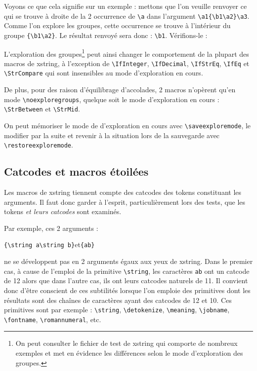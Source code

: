 \documentclass[a4paper,10pt]{article}
\newcommand\Xstring{\textsf{xstring}\xspace}
\newcommand\verbinline{\lstinline[basicstyle=\normalsize\ttfamily]}
\begin{document}
Voyons ce que cela signifie sur un exemple : mettons que l'on veuille renvoyer ce qui se trouve à droite de la 2\ieme{} occurrence de \verb|\a| dans l'argument \verb|\a1{\b1\a2}\a3|. Comme l'on explore les groupes, cette occurrence se trouve à l'intérieur du groupe \verb|{\b1\a2}|. Le résultat renvoyé sera donc : \verb|\b1|. Vérifions-le :



L'exploration des groupes\footnote{On peut consulter le fichier de test de \Xstring qui comporte de nombreux exemples et met en évidence les différences selon le mode d'exploration des groupes.} peut ainsi changer le comportement de la plupart des macros de \Xstring, à l'exception de \verbinline|\IfInteger|, \verbinline|\IfDecimal|, \verbinline|\IfStrEq|, \verbinline|\IfEq| et \verbinline|\StrCompare| qui sont insensibles au mode d'exploration en cours.

De plus, pour des raison d'équilibrage d'accolades, 2 macros n'opèrent qu'en mode \verbinline|\noexploregroups|, quelque soit le mode d'exploration en cours : \verbinline|\StrBetween| et \verbinline|\StrMid|.\medskip

On peut mémoriser le mode de d'exploration en cours avec \verbinline|\saveexploremode|, le modifier par la suite et revenir à la situation lors de la sauvegarde avec \verbinline|\restoreexploremode|.

\subsection{Catcodes et macros étoilées}
\label{macrosetoilees}
Les macros de \Xstring tiennent compte des catcodes des tokens constituant les arguments. Il faut donc garder à l'esprit, particulièrement lors des tests, que les tokens \emph{et leurs catcodes} sont examinés.\medskip

Par exemple, ces 2 arguments :\par\nobreak\smallskip
\hfil\verb|{\string a\string b}|\qquad et\qquad\verb|{ab}|\hfil{}\par\smallskip
ne se développent pas en 2 arguments égaux aux yeux de \Xstring. Dans le premier cas, à cause de l'emploi de la primitive \verb|\string|, les caractères \og\verb|ab|\fg{} ont un catcode de 12 alors que dans l'autre cas, ils ont leurs catcodes naturels de 11. Il convient donc d'être conscient de ces subtilités lorsque l'on emploie des primitives dont les résultats sont des chaînes de caractères ayant des catcodes de 12 et 10. Ces primitives sont par exemple : \verb|\string|, \verb|\detokenize|, \verb|\meaning|, \verb|\jobname|, \verb|\fontname|, \verb|\romannumeral|, etc.\medskip
\end{document}
